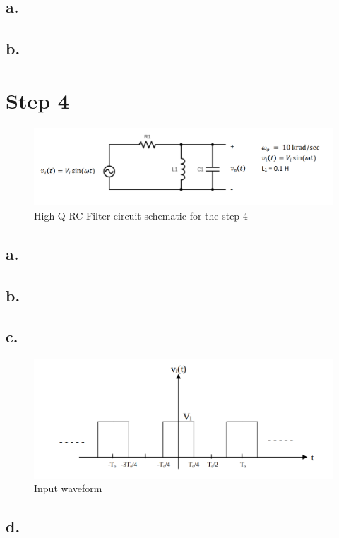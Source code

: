 \documentclass[letterpaper,12pt]{article}
\begin{document}
\subsection{a.}
\subsection{b.}

\section{Step 4}
\begin{figure}[H]
    \centering
    \includegraphics[width=1\textwidth]{highq.png}
    \caption{High-Q RC Filter circuit schematic for the step 4}
\end{figure} 

\subsection{a.}
\subsection{b.}
\subsection{c.}
\begin{figure}[H]
    \centering
    \includegraphics[width=1\textwidth]{RCwaveform.png}
    \caption{Input waveform}
\end{figure} 

\subsection{d.}
\end{document}
